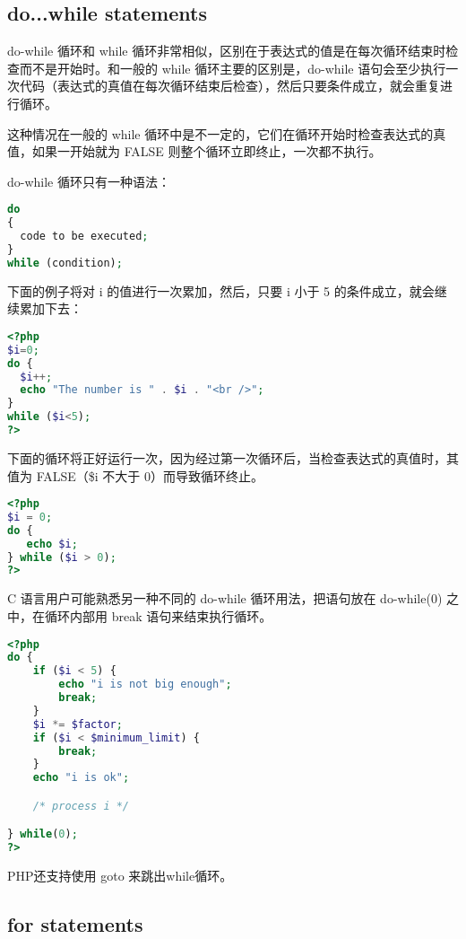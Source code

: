 \subsection{do...while statements}

do-while 循环和 while 循环非常相似，区别在于表达式的值是在每次循环结束时检查而不是开始时。和一般的 while 循环主要的区别是，do-while 语句会至少执行一次代码（表达式的真值在每次循环结束后检查），然后只要条件成立，就会重复进行循环。

这种情况在一般的 while 循环中是不一定的，它们在循环开始时检查表达式的真值，如果一开始就为 FALSE 则整个循环立即终止，一次都不执行。

do-while 循环只有一种语法：

\begin{lstlisting}[language=PHP]
do
{
  code to be executed;
}
while (condition); 
\end{lstlisting}

下面的例子将对 i 的值进行一次累加，然后，只要 i 小于 5 的条件成立，就会继续累加下去：

\begin{lstlisting}[language=PHP]
<?php 
$i=0;
do {
  $i++;
  echo "The number is " . $i . "<br />";
}
while ($i<5);
?>
\end{lstlisting}

下面的循环将正好运行一次，因为经过第一次循环后，当检查表达式的真值时，其值为 FALSE（\$i 不大于 0）而导致循环终止。

\begin{lstlisting}[language=PHP]
<?php
$i = 0;
do {
   echo $i;
} while ($i > 0);
?>
\end{lstlisting}


C 语言用户可能熟悉另一种不同的 do-while 循环用法，把语句放在 do-while(0) 之中，在循环内部用 break 语句来结束执行循环。


\begin{lstlisting}[language=PHP]
<?php
do {
    if ($i < 5) {
        echo "i is not big enough";
        break;
    }
    $i *= $factor;
    if ($i < $minimum_limit) {
        break;
    }
    echo "i is ok";

    /* process i */

} while(0);
?>
\end{lstlisting}

PHP还支持使用 goto 来跳出while循环。


\subsection{for statements}

